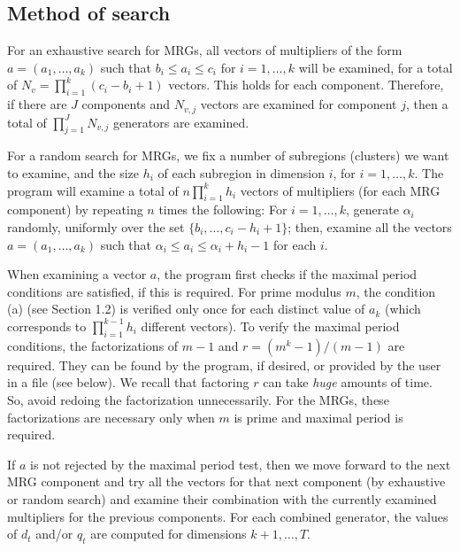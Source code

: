 \subsection* {Method of search}

For an exhaustive search for MRGs, all vectors of multipliers
of the form $a = (a_1,\dots,a_k)$
such that $b_i\le a_i\le c_i$ for $i=1,\dots,k$ will be examined, for
a total of $N_v = \prod_{i=1}^k (c_i-b_i+1)$ vectors.
This holds for each component.
Therefore, if there are $J$ components and $N_{v,j}$ vectors are
examined for component $j$, then a total of $\prod_{j=1}^J N_{v,j}$
generators are examined.

For a random search for MRGs, we fix a number of subregions (clusters)
we want to examine, and the size $h_i$ of each subregion in dimension $i$,
for $i=1,\dots,k$.  The program will examine a total of
$n\prod_{i=1}^k h_i$ vectors of multipliers (for each MRG component)
by repeating $n$ times the following:
  For $i=1,\dots,k$, generate $\alpha_i$ randomly, uniformly over the set
  $\{b_i,\dots,c_i-h_i+1\}$;  then, examine all the vectors
  $a = (a_1,\dots,a_k)$ such that $\alpha_i\le a_i\le \alpha_i+h_i-1$
  for each $i$.

When examining a vector $a$, the program first checks if the maximal
period conditions are satisfied, if this is required.
For prime modulus $m$, the condition (a) (see Section 1.2) is verified
only once for each distinct value of $a_k$ (which corresponds to
$\prod_{i=1}^{k-1} h_i$ different vectors).
To verify the maximal period conditions, the factorizations of $m-1$ and
$r = (m^k-1)/(m-1)$ are required.  They can be found by the program,
if desired, or provided by the user in a file (see below).
We recall that factoring $r$ can take {\em huge} amounts of time.
So, avoid redoing the factorization unnecessarily.
For the MRGs, these factorizations are necessary only when $m$ is
prime and maximal period is required.

If $a$ is not rejected by the maximal period test, then we move forward
to the next MRG component and try all the vectors for that next component
(by exhaustive or random search) and examine their combination with
the currently examined multipliers for the previous components.
For each combined generator, the values of $d_t$ and/or $q_t$ are 
computed for dimensions $k+1,\dots,T$.  

